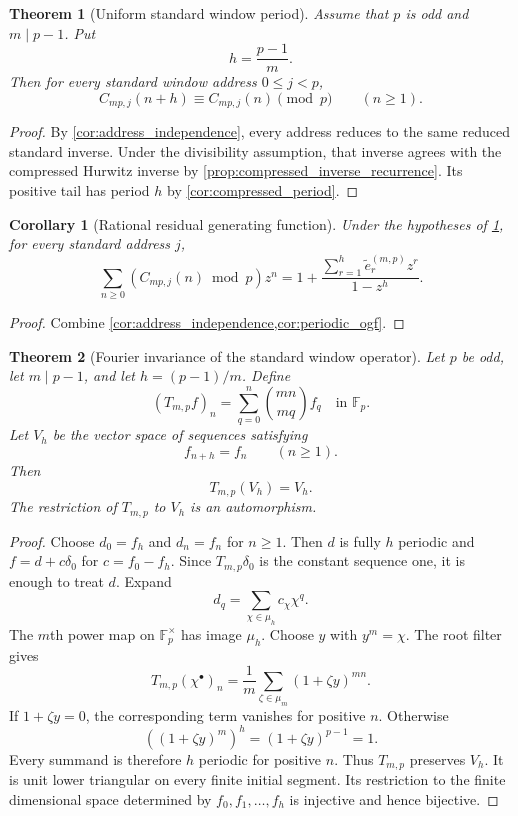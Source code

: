 \documentclass{aomart}
\newtheorem{theorem}{Theorem}[section]
\newtheorem{corollary}[corollary]{Corollary}
\theoremstyle{definition}
\theoremstyle{remark}
\newcommand{\FF}{\mathbb F}
\begin{document}
\begin{theorem}[Uniform standard window period]\label{thm:standard_window_period}
Assume that \(p\) is odd and \(m\mid p-1\). Put
\[
h=\frac{p-1}{m}.
\]
Then for every standard window address \(0\leq j<p\),
\[
\boxed{
C_{mp,j}(n+h)
\equiv
C_{mp,j}(n)
\pmod p
\qquad(n\geq1).
}
\]
\end{theorem}

\begin{proof}
By \cref{cor:address_independence}, every address reduces to the same reduced standard inverse. Under the divisibility assumption, that inverse agrees with the compressed Hurwitz inverse by \cref{prop:compressed_inverse_recurrence}. Its positive tail has period \(h\) by \cref{cor:compressed_period}.
\end{proof}

\begin{corollary}[Rational residual generating function]\label{cor:standard_rational_ogf}
Under the hypotheses of \cref{thm:standard_window_period}, for every standard address \(j\),
\[
\sum_{n\geq0}
\left(C_{mp,j}(n)\bmod p\right)z^n
=
1+
\frac{
\sum_{r=1}^{h}\widetilde e_r^{(m,p)}z^r
}{1-z^h}.
\]
\end{corollary}

\begin{proof}
Combine \cref{cor:address_independence,cor:periodic_ogf}.
\end{proof}


\begin{theorem}[Fourier invariance of the standard window operator]\label{thm:standard_window_fourier}
Let \(p\) be odd, let \(m\mid p-1\), and let \(h=(p-1)/m\). Define
\[
(T_{m,p}f)_n
=
\sum_{q=0}^{n}\binom{mn}{mq}f_q
\quad\text{in }\FF_p.
\]
Let \(V_h\) be the vector space of sequences satisfying
\[
f_{n+h}=f_n
\qquad(n\geq1).
\]
Then
\[
\boxed{T_{m,p}(V_h)=V_h.}
\]
The restriction of \(T_{m,p}\) to \(V_h\) is an automorphism.
\end{theorem}

\begin{proof}
Choose \(d_0=f_h\) and \(d_n=f_n\) for \(n\geq1\). Then \(d\) is fully \(h\) periodic and \(f=d+c\delta_0\) for \(c=f_0-f_h\). Since \(T_{m,p}\delta_0\) is the constant sequence one, it is enough to treat \(d\). Expand
\[
d_q=\sum_{\chi\in\mu_h}c_\chi\chi^q.
\]
The \(m\)th power map on \(\FF_p^\times\) has image \(\mu_h\). Choose \(y\) with \(y^m=\chi\). The root filter gives
\[
T_{m,p}(\chi^\bullet)_n
=
\frac1m
\sum_{\zeta\in\mu_m}
(1+\zeta y)^{mn}.
\]
If \(1+\zeta y=0\), the corresponding term vanishes for positive \(n\). Otherwise
\[
\left((1+\zeta y)^m\right)^h
=
(1+\zeta y)^{p-1}
=1.
\]
Every summand is therefore \(h\) periodic for positive \(n\). Thus \(T_{m,p}\) preserves \(V_h\). It is unit lower triangular on every finite initial segment. Its restriction to the finite dimensional space determined by \(f_0,f_1,\ldots,f_h\) is injective and hence bijective.
\end{proof}
\end{document}
